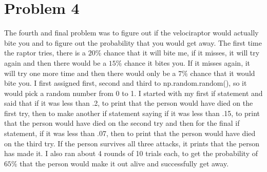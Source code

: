 \documentclass[twocolumn]{revtex4}
\begin{document}
\section{Problem 4}
The fourth and final problem was to figure out if the velociraptor would actually bite you and to figure out the probability that you would get away. The first time the raptor tries, there is a $20\%$  chance that it will bite me, if it misses, it will try again and then there would be a $15\%$ chance it bites you. If it misses again, it will try one more time and then there would only be a $7\%$ chance that it would bite you. I first assigned first, second and third to np.random.random(), so it would pick a random number from 0 to 1. I started with my first if statement and said that if it was less than .2, to print that the person would have died on the first try, then to make another if statement saying if it was less than .15, to print that the person would have died on the second try and then for the final if statement, if it was less than .07, then to print that the person would have died on the third try. If the person survives all three attacks, it prints that the person has made it. I also ran about 4 rounds of 10 trials each, to get the probability of $65\%$ that the person would make it out alive and successfully get away.

\end{document}
